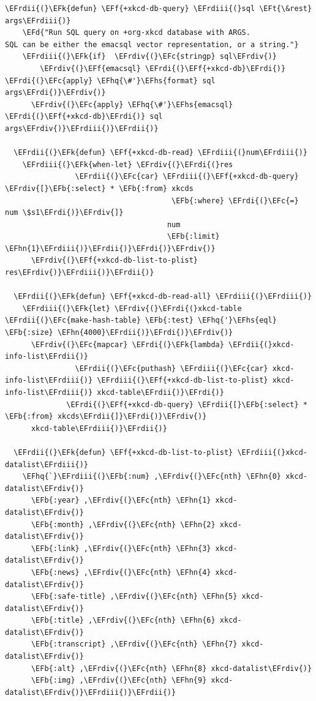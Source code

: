 \documentclass{scrartcl}
\newcommand{\EFk}[1]{\textcolor{EFk}{#1}} %
\newcommand{\EFd}[1]{\textcolor{EFd}{#1}} %
\newcommand{\EFt}[1]{\textcolor{EFt}{#1}} %
\newcommand{\EFb}[1]{\textcolor{EFb}{#1}} %
\newcommand{\EFc}[1]{\textcolor{EFc}{#1}} %
\newcommand{\EFf}[1]{\textcolor{EFf}{#1}} %
\newcommand{\EFhn}[1]{#1} %
\newcommand{\EFhq}[1]{#1} %
\newcommand{\EFhs}[1]{#1} %
\newcommand{\EFrdi}[1]{#1} %
\newcommand{\EFrdii}[1]{#1} %
\newcommand{\EFrdiii}[1]{#1} %
\newcommand{\EFrdiv}[1]{#1} %
\begin{document}
\begin{Code}
\begin{Verbatim}[]
  \EFrdii{(}\EFk{defun} \EFf{+xkcd-db-query} \EFrdiii{(}sql \EFt{\&rest} args\EFrdiii{)}
    \EFd{"Run SQL query on +org-xkcd database with ARGS.
SQL can be either the emacsql vector representation, or a string."}
    \EFrdiii{(}\EFk{if}  \EFrdiv{(}\EFc{stringp} sql\EFrdiv{)}
        \EFrdiv{(}\EFf{emacsql} \EFrdi{(}\EFf{+xkcd-db}\EFrdi{)} \EFrdi{(}\EFc{apply} \EFhq{\#'}\EFhs{format} sql args\EFrdi{)}\EFrdiv{)}
      \EFrdiv{(}\EFc{apply} \EFhq{\#'}\EFhs{emacsql} \EFrdi{(}\EFf{+xkcd-db}\EFrdi{)} sql args\EFrdiv{)}\EFrdiii{)}\EFrdii{)}

  \EFrdii{(}\EFk{defun} \EFf{+xkcd-db-read} \EFrdiii{(}num\EFrdiii{)}
    \EFrdiii{(}\EFk{when-let} \EFrdiv{(}\EFrdi{(}res
                \EFrdii{(}\EFc{car} \EFrdiii{(}\EFf{+xkcd-db-query} \EFrdiv{[}\EFb{:select} * \EFb{:from} xkcds
                                      \EFb{:where} \EFrdi{(}\EFc{=} num \$s1\EFrdi{)}\EFrdiv{]}
                                     num
                                     \EFb{:limit} \EFhn{1}\EFrdiii{)}\EFrdii{)}\EFrdi{)}\EFrdiv{)}
      \EFrdiv{(}\EFf{+xkcd-db-list-to-plist} res\EFrdiv{)}\EFrdiii{)}\EFrdii{)}

  \EFrdii{(}\EFk{defun} \EFf{+xkcd-db-read-all} \EFrdiii{(}\EFrdiii{)}
    \EFrdiii{(}\EFk{let} \EFrdiv{(}\EFrdi{(}xkcd-table \EFrdii{(}\EFc{make-hash-table} \EFb{:test} \EFhq{'}\EFhs{eql} \EFb{:size} \EFhn{4000}\EFrdii{)}\EFrdi{)}\EFrdiv{)}
      \EFrdiv{(}\EFc{mapcar} \EFrdi{(}\EFk{lambda} \EFrdii{(}xkcd-info-list\EFrdii{)}
                \EFrdii{(}\EFc{puthash} \EFrdiii{(}\EFc{car} xkcd-info-list\EFrdiii{)} \EFrdiii{(}\EFf{+xkcd-db-list-to-plist} xkcd-info-list\EFrdiii{)} xkcd-table\EFrdii{)}\EFrdi{)}
              \EFrdi{(}\EFf{+xkcd-db-query} \EFrdii{[}\EFb{:select} * \EFb{:from} xkcds\EFrdii{]}\EFrdi{)}\EFrdiv{)}
      xkcd-table\EFrdiii{)}\EFrdii{)}

  \EFrdii{(}\EFk{defun} \EFf{+xkcd-db-list-to-plist} \EFrdiii{(}xkcd-datalist\EFrdiii{)}
    \EFhq{`}\EFrdiii{(}\EFb{:num} ,\EFrdiv{(}\EFc{nth} \EFhn{0} xkcd-datalist\EFrdiv{)}
      \EFb{:year} ,\EFrdiv{(}\EFc{nth} \EFhn{1} xkcd-datalist\EFrdiv{)}
      \EFb{:month} ,\EFrdiv{(}\EFc{nth} \EFhn{2} xkcd-datalist\EFrdiv{)}
      \EFb{:link} ,\EFrdiv{(}\EFc{nth} \EFhn{3} xkcd-datalist\EFrdiv{)}
      \EFb{:news} ,\EFrdiv{(}\EFc{nth} \EFhn{4} xkcd-datalist\EFrdiv{)}
      \EFb{:safe-title} ,\EFrdiv{(}\EFc{nth} \EFhn{5} xkcd-datalist\EFrdiv{)}
      \EFb{:title} ,\EFrdiv{(}\EFc{nth} \EFhn{6} xkcd-datalist\EFrdiv{)}
      \EFb{:transcript} ,\EFrdiv{(}\EFc{nth} \EFhn{7} xkcd-datalist\EFrdiv{)}
      \EFb{:alt} ,\EFrdiv{(}\EFc{nth} \EFhn{8} xkcd-datalist\EFrdiv{)}
      \EFb{:img} ,\EFrdiv{(}\EFc{nth} \EFhn{9} xkcd-datalist\EFrdiv{)}\EFrdiii{)}\EFrdii{)}


\end{Verbatim}
\end{Code}
\end{document}
